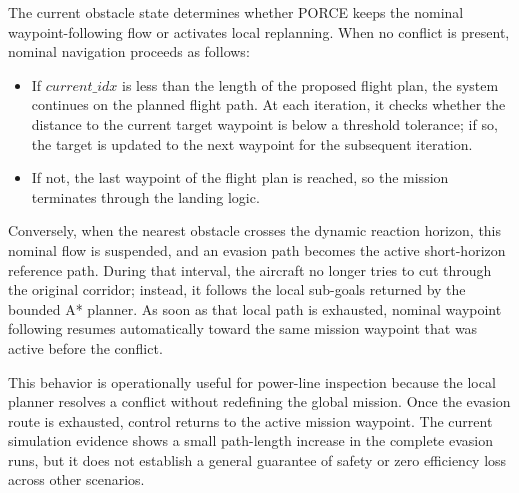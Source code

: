 \documentclass[electronics,article,submit,moreauthors]{Definitions/mdpi}
\DeclareRobustCommand{\deleted}[1]{}%
\DeclareRobustCommand{\added}[1]{#1}%
\DeclareRobustCommand{\deleted}[1]{\textcolor{black}{\sout{#1}}}
\DeclareRobustCommand{\added}[1]{\textcolor{green!50!black}{#1}}
\def\deleted#1{}%
\def\added#1{#1}%
\begin{document}
\deleted{This detection function is the key element to select the path inside the control loop. If}\added{The current obstacle state determines whether PORCE keeps the nominal waypoint-following flow or activates local replanning. When} no conflict is \deleted{detected, the system executes the}\added{present,} nominal navigation \deleted{flow following the previously planned trajectory. The nominal navigation works}\added{proceeds} as follows:
\begin{itemize}
    \item If $current\_idx$ is less than the length of the proposed \deleted{Flight Plan}\added{flight plan}, the system continues on the planned flight path. At each iteration, it checks whether the distance to the current target waypoint is below a threshold tolerance; if so, the target is updated to the next waypoint for the subsequent iteration.
    \item If not, the last waypoint of the \deleted{Flight Plan}\added{flight plan} is reached, so the \deleted{Mission}\added{mission} terminates through the landing logic.
\end{itemize}

Conversely, when the nearest obstacle crosses the dynamic reaction horizon, this nominal flow is suspended, and an evasion path becomes the active short-horizon reference path. During that interval, the aircraft no longer tries to cut through the original corridor; instead, it follows the local sub-goals returned by the bounded A* planner. As soon as that local path is exhausted, nominal waypoint following resumes automatically toward the same \deleted{Mission}\added{mission} waypoint that was active before the conflict.

This behavior is operationally \deleted{important for powerline}\added{useful for power-line} inspection\deleted{. The objective of the method is not merely to avoid collisions, but to resolve}\added{ because the} local \deleted{conflicts in real time}\added{planner resolves a conflict without redefining the global mission}. Once \deleted{safe conditions are restored, the system}\added{the evasion route is exhausted, control} returns to the \deleted{globally planned route as quickly as possible. In this way, operational}\added{active mission waypoint. The current simulation evidence shows a small path-length increase in the complete evasion runs, but it does not establish a general guarantee of} safety \deleted{is maintained without compromising the}\added{or zero} efficiency \deleted{objective defined during the initial global planning stage, whether optimized data acquisition, Mission progression, or any}\added{loss across} other \deleted{Mission-specific metric established a priori.}\added{scenarios.}
\end{document}
